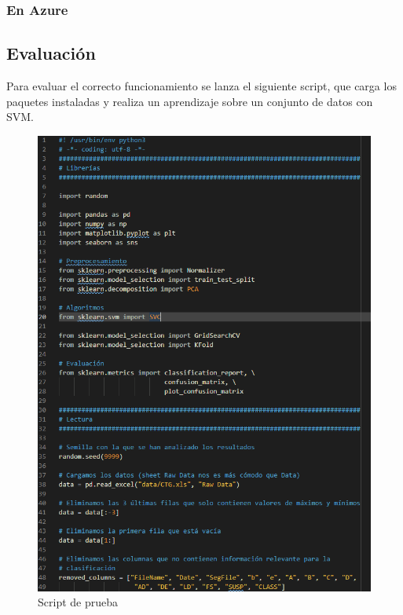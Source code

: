 \subsubsection{En Azure}


\subsection{Evaluación}

Para evaluar el correcto funcionamiento se lanza el siguiente script, que carga los paquetes instaladas y realiza un aprendizaje sobre un conjunto de datos con SVM.

\begin{figure}[H]\center\includegraphics[width=.95\linewidth]{img/python/p6.png}\caption{Script de prueba}\end{figure}